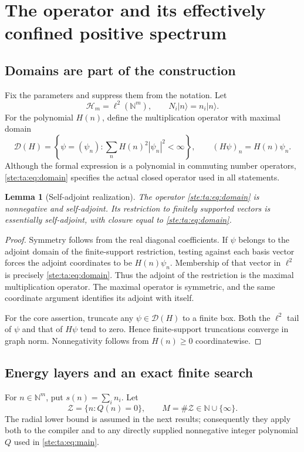 \documentclass[11pt,letterpaper]{article}
\newtheorem{lemma}[theorem]{Lemma}
\theoremstyle{definition}
\theoremstyle{remark}
\newcommand{\N}{\mathbb N}
\newcommand{\Hil}{\mathcal H}
\newcommand{\ket}[1]{\lvert #1\rangle}
\newcommand{\abs}[1]{\left\lvert #1\right\rvert}
\begin{document}
\section{The operator and its effectively confined positive spectrum}
\subsection{Domains are part of the construction}
Fix the parameters and suppress them from the notation. Let
\[
\Hil_m=\ell^2(\N^m),\qquad
N_i\ket n=n_i\ket n.
\]
For the polynomial $H(n)$, define the multiplication operator with maximal domain
\begin{equation}\label{ste:ta:eq:domain}
\mathcal D(H)=\left\{\psi=(\psi_n):
\sum_n H(n)^2\abs{\psi_n}^2<\infty\right\},
\qquad (H\psi)_n=H(n)\psi_n.
\end{equation}
Although the formal expression is a polynomial in commuting number operators, \eqref{ste:ta:eq:domain} specifies the actual closed operator used in all statements.

\begin{lemma}[Self-adjoint realization]\label{ste:ta:lem:selfadjoint}
The operator \eqref{ste:ta:eq:domain} is nonnegative and self-adjoint. Its restriction to finitely supported vectors is essentially self-adjoint, with closure equal to \eqref{ste:ta:eq:domain}.
\end{lemma}
\begin{proof}
Symmetry follows from the real diagonal coefficients. If $\psi$ belongs to the adjoint domain of the finite-support restriction, testing against each basis vector forces the adjoint coordinates to be $H(n)\psi_n$. Membership of that vector in $\ell^2$ is precisely \eqref{ste:ta:eq:domain}. Thus the adjoint of the restriction is the maximal multiplication operator. The maximal operator is symmetric, and the same coordinate argument identifies its adjoint with itself.

For the core assertion, truncate any $\psi\in\mathcal D(H)$ to a finite box. Both the $\ell^2$ tail of $\psi$ and that of $H\psi$ tend to zero. Hence finite-support truncations converge in graph norm. Nonnegativity follows from $H(n)\ge0$ coordinatewise.
\end{proof}

\subsection{Energy layers and an exact finite search}
For $n\in\N^m$, put $s(n)=\sum_i n_i$. Let
\[
\mathcal Z=\{n:Q(n)=0\},\qquad
M=\#\mathcal Z\in\N\cup\{\infty\}.
\]
The radial lower bound is assumed in the next results; consequently they apply both to the compiler and to any directly supplied nonnegative integer polynomial $Q$ used in \eqref{ste:ta:eq:main}.
\end{document}
